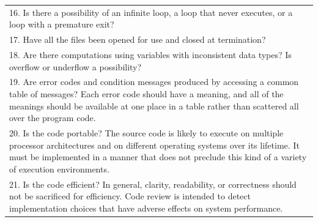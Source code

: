 \begin{table}[H]
\begin{adjustbox}{max height=\textheight, max width=\textwidth}
\begin{tabular}{p{\textwidth}}
            16. Is there a possibility of an infinite loop, a loop that never executes, or a loop with a premature exit?\\
            17. Have all the files been opened for use and closed at termination?\\
            18. Are there computations using variables with inconsistent data types? Is overflow or underflow a possibility?\\
            19. Are error codes and condition messages produced by accessing a common table of messages? Each error code should have a meaning, and all of the meanings should be available at one place in a table rather than scattered all over the program code.\\
            20. Is the code portable? The source code is likely to execute on multiple processor architectures and on different operating systems over its lifetime. It must be implemented in a manner that does not preclude this kind of a variety of execution environments.\\
            21. Is the code efficient? In general, clarity, readability, or correctness should not be sacrificed for efficiency. Code review is intended to detect implementation choices that have adverse effects on system performance.\\
            \bottomrule
        \end{tabular}
    \end{adjustbox}
\end{table}

